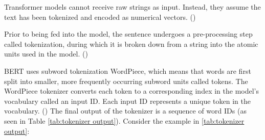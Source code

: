 Transformer models cannot receive raw strings as input. Instead, they assume the text has been tokenized and encoded as numerical vectors. (\cite{tunstall_natural_2022})

Prior to being fed into the model, the sentence undergoes a pre-processing step called tokenization, during which it is broken down from a string into the atomic units used in the model. (\cite{tunstall_natural_2022})

BERT uses subword tokenization WordPiece, which means that words are first split into smaller, more frequently occurring subword units called tokens. The WordPiece tokenizer converts each token to a corresponding index in the model's vocabulary called an input ID. Each input ID represents a unique token in the vocabulary. (\cite{tunstall_natural_2022}) The final output of the tokenizer is a sequence of word IDs (as seen in Table \ref{tab:tokenizer output}). Consider the example in \ref{tab:tokenizer output}:

